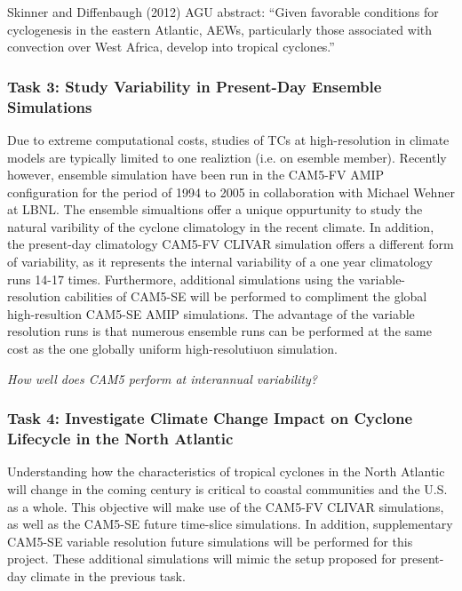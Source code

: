 \documentclass[11pt]{article}
\begin{document}
Skinner and Diffenbaugh (2012) AGU abstract: ``Given favorable conditions for cyclogenesis in the eastern Atlantic, AEWs, particularly those associated with convection over West Africa, develop into tropical cyclones.''


\subsubsection{Task 3: Study Variability in Present-Day Ensemble Simulations}

Due to extreme computational costs, studies of TCs at high-resolution in climate models are typically limited to one realiztion (i.e. on esemble member). Recently however, ensemble simulation have been run in the CAM5-FV AMIP configuration for the period of 1994 to 2005 in collaboration with Michael Wehner at LBNL. The ensemble simualtions offer a unique oppurtunity to study the natural varibility of the cyclone climatology in the recent climate. In addition, the present-day climatology CAM5-FV CLIVAR simulation offers a different form of variability, as it represents the internal variability of a one year climatology runs 14-17 times. Furthermore, additional simulations using the variable-resolution cabilities of CAM5-SE will be performed to compliment the global high-resultion CAM5-SE AMIP simulations. The advantage of the variable resolution runs is that numerous ensemble runs can be performed at the same cost as the one globally uniform high-resolutiuon simulation.

\emph{How well does CAM5 perform at interannual variability?}


\subsubsection{Task 4: Investigate Climate Change Impact on Cyclone Lifecycle in the North Atlantic}

Understanding how the characteristics of tropical cyclones in the North Atlantic will change in the coming century is critical to coastal communities and the U.S. as a whole. This objective will make use of the CAM5-FV CLIVAR simulations, as well as the CAM5-SE future time-slice simulations. In addition, supplementary CAM5-SE variable resolution future simulations will be performed for this project. These additional simulations will mimic the setup proposed for present-day climate in the previous task. 
\end{document}

